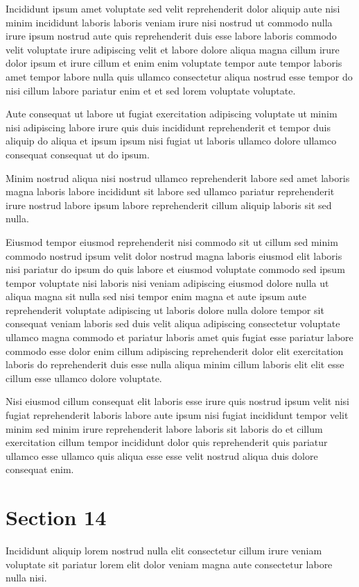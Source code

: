 \documentclass{article}
\begin{document}
Incididunt ipsum amet voluptate sed velit reprehenderit dolor aliquip aute nisi minim incididunt laboris laboris veniam irure nisi nostrud ut commodo nulla irure ipsum nostrud aute quis reprehenderit duis esse labore laboris commodo velit voluptate irure adipiscing velit et labore dolore aliqua magna cillum irure dolor ipsum et irure cillum et enim enim voluptate tempor aute tempor laboris amet tempor labore nulla quis ullamco consectetur aliqua nostrud esse tempor do nisi cillum labore pariatur enim et et sed lorem voluptate voluptate.

Aute consequat ut labore ut fugiat exercitation adipiscing voluptate ut minim nisi adipiscing labore irure quis duis incididunt reprehenderit et tempor duis aliquip do aliqua et ipsum ipsum nisi fugiat ut laboris ullamco dolore ullamco consequat consequat ut do ipsum.

Minim nostrud aliqua nisi nostrud ullamco reprehenderit labore sed amet laboris magna laboris labore incididunt sit labore sed ullamco pariatur reprehenderit irure nostrud labore ipsum labore reprehenderit cillum aliquip laboris sit sed nulla.

Eiusmod tempor eiusmod reprehenderit nisi commodo sit ut cillum sed minim commodo nostrud ipsum velit dolor nostrud magna laboris eiusmod elit laboris nisi pariatur do ipsum do quis labore et eiusmod voluptate commodo sed ipsum tempor voluptate nisi laboris nisi veniam adipiscing eiusmod dolore nulla ut aliqua magna sit nulla sed nisi tempor enim magna et aute ipsum aute reprehenderit voluptate adipiscing ut laboris dolore nulla dolore tempor sit consequat veniam laboris sed duis velit aliqua adipiscing consectetur voluptate ullamco magna commodo et pariatur laboris amet quis fugiat esse pariatur labore commodo esse dolor enim cillum adipiscing reprehenderit dolor elit exercitation laboris do reprehenderit duis esse nulla aliqua minim cillum laboris elit elit esse cillum esse ullamco dolore voluptate.

Nisi eiusmod cillum consequat elit laboris esse irure quis nostrud ipsum velit nisi fugiat reprehenderit laboris labore aute ipsum nisi fugiat incididunt tempor velit minim sed minim irure reprehenderit labore laboris sit laboris do et cillum exercitation cillum tempor incididunt dolor quis reprehenderit quis pariatur ullamco esse ullamco quis aliqua esse esse velit nostrud aliqua duis dolore consequat enim.

\section{Section 14}
Incididunt aliquip lorem nostrud nulla elit consectetur cillum irure veniam voluptate sit pariatur lorem elit dolor veniam magna aute consectetur labore nulla nisi.
\end{document}
